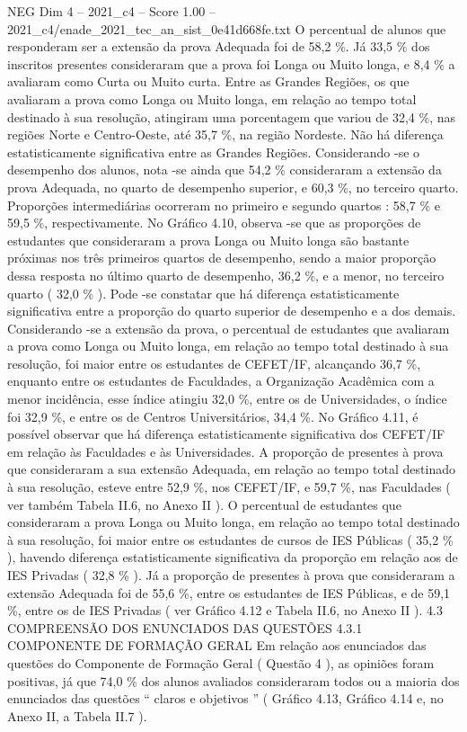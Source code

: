 \begin{textsample}{NEG Dim 4 – 2021\_c4 – Score 1.00 – 2021\_c4/enade\_2021\_tec\_an\_sist\_0e41d668fe.txt}
O percentual de alunos que responderam ser a extensão da prova Adequada foi de 58,2 \%.
Já 33,5 \% dos inscritos presentes consideraram que a prova foi Longa ou Muito longa, e 8,4 \% a avaliaram como Curta ou Muito curta.
Entre as Grandes Regiões, os que avaliaram a prova como Longa ou Muito longa, em relação ao tempo total destinado à sua resolução, atingiram uma porcentagem que variou de 32,4 \%, nas regiões Norte e Centro-Oeste, até 35,7 \%, na região Nordeste.
Não há diferença estatisticamente significativa entre as Grandes Regiões.
Considerando -se o desempenho dos alunos, nota -se ainda que 54,2 \% consideraram a extensão da prova Adequada, no quarto de desempenho superior, e 60,3 \%, no terceiro quarto.
Proporções intermediárias ocorreram no primeiro e segundo quartos : 58,7 \% e 59,5 \%, respectivamente.
No Gráfico 4.10, observa -se que as proporções de estudantes que consideraram a prova Longa ou Muito longa são bastante próximas nos três primeiros quartos de desempenho, sendo a maior proporção dessa resposta no último quarto de desempenho, 36,2 \%, e a menor, no terceiro quarto ( 32,0 \% ).
Pode -se constatar que há diferença estatisticamente significativa entre a proporção do quarto superior de desempenho e a dos demais.
Considerando -se a extensão da prova, o percentual de estudantes que avaliaram a prova como Longa ou Muito longa, em relação ao tempo total destinado à sua resolução, foi maior entre os estudantes de CEFET/IF, alcançando 36,7 \%, enquanto entre os estudantes de Faculdades, a Organização Acadêmica com a menor incidência, esse índice atingiu 32,0 \%, entre os de Universidades, o índice foi 32,9 \%, e entre os de Centros Universitários, 34,4 \%.
No Gráfico 4.11, é possível observar que há diferença estatisticamente significativa dos CEFET/IF em relação às Faculdades e às Universidades.
A proporção de presentes à prova que consideraram a sua extensão Adequada, em relação ao tempo total destinado à sua resolução, esteve entre 52,9 \%, nos CEFET/IF, e 59,7 \%, nas Faculdades ( ver também Tabela II.6, no Anexo II ).
O percentual de estudantes que consideraram a prova Longa ou Muito longa, em relação ao tempo total destinado à sua resolução, foi maior entre os estudantes de cursos de IES Públicas ( 35,2 \% ), havendo diferença estatisticamente significativa da proporção em relação aos de IES Privadas ( 32,8 \% ).
Já a proporção de presentes à prova que consideraram a extensão Adequada foi de 55,6 \%, entre os estudantes de IES Públicas, e de 59,1 \%, entre os de IES Privadas ( ver Gráfico 4.12 e Tabela II.6, no Anexo II ). 4.3 COMPREENSÃO DOS ENUNCIADOS DAS QUESTÕES 4.3.1 COMPONENTE DE FORMAÇÃO GERAL Em relação aos enunciados das questões do Componente de Formação Geral ( Questão 4 ), as opiniões foram positivas, já que 74,0 \% dos alunos avaliados consideraram todos ou a maioria dos enunciados das questões “ claros e objetivos ” ( Gráfico 4.13, Gráfico 4.14 e, no Anexo II, a Tabela II.7 ).

\end{textsample}
